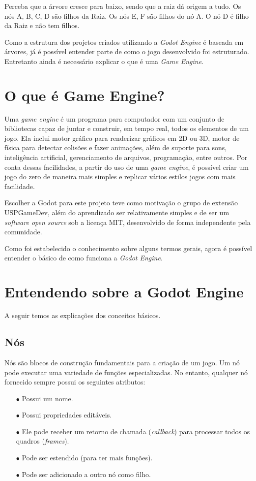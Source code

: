 Perceba que a árvore cresce para baixo, sendo que a raiz dá origem a tudo.
Os nós A, B, C, D são filhos da Raiz. Os nós E, F são filhos do nó A. O nó
D é filho da Raiz e não tem filhos.

Como a estrutura dos projetos criados utilizando a \textit{Godot Engine} é 
baseada em árvores, já é possível entender parte de como o jogo desenvolvido foi 
estruturado. Entretanto ainda é necessário explicar o que é uma 
\textit{Game Engine}.


\section{O que é Game Engine?}

Uma \textit{game engine} é um programa para computador com um conjunto de 
bibliotecas capaz de juntar e construir, em tempo real, todos os elementos de um
jogo.
Ela inclui motor gráfico para renderizar gráficos em 2D ou 3D, motor de física 
para detectar colisões e fazer animações, além de suporte para sons, 
inteligência artificial, gerenciamento de arquivos, programação, entre outros.
Por conta dessas facilidades, a partir do uso de uma \textit{game engine}, é 
possível criar um jogo do zero de maneira mais simples e replicar vários estilos
jogos com mais facilidade.

Escolher a Godot para este projeto teve como motivação o grupo de extensão 
USPGameDev, além do aprendizado ser relativamente simples e de ser um 
\textit{software open source} sob a licença MIT, desenvolvido de forma 
independente pela comunidade.

Como foi estabelecido o conhecimento sobre alguns termos gerais, agora é
possível entender o básico de como funciona a \textit{Godot Engine}.

\section{Entendendo sobre a Godot Engine}

A seguir temos as explicações dos conceitos básicos.

\subsection{Nós}

Nós são blocos de construção fundamentais para a criação de um jogo. Um nó pode
executar uma variedade de funções especializadas.
No entanto, qualquer nó fornecido sempre possui os seguintes atributos:
\begin{itemize}
    \item[$\bullet$]
        Possui um nome.
    \item[$\bullet$]
        Possui propriedades editáveis.
    \item[$\bullet$]
        Ele pode receber um retorno de chamada (\textit{callback}) para 
        processar todos os quadros (\textit{frames}).
    \item[$\bullet$]
        Pode ser estendido (para ter mais funções).
    \item[$\bullet$]
        Pode ser adicionado a outro nó como filho.
\end{itemize}

